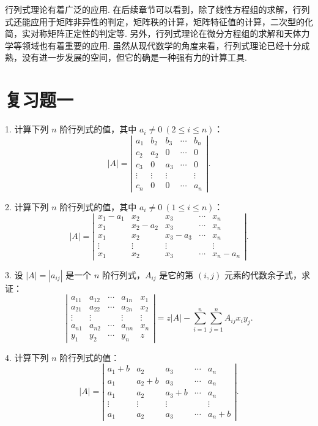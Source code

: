 \documentclass[UTF8, 12pt, fontset=fandol, oneside]{ctexart}
\begin{document}
行列式理论有着广泛的应用. 在后续章节可以看到，除了线性方程组的求解，行列式还能应用于矩阵非异性的判定，矩阵秩的计算，矩阵特征值的计算，二次型的化简，实对称矩阵正定性的判定等. 另外，行列式理论在微分方程组的求解和天体力学等领域也有着重要的应用. 虽然从现代数学的角度来看，行列式理论已经十分成熟，没有进一步发展的空间，但它的确是一种强有力的计算工具.

\section*{复习题一}

1. 计算下列 $n$ 阶行列式的值，其中 $a_i\ne0\ (2\le i\le n)$：
\[
|A|=
\left|\begin{array}{ccccc}
a_1&b_2&b_3&\cdots&b_n\\
c_2&a_2&0&\cdots&0\\
c_3&0&a_3&\cdots&0\\
\vdots&\vdots&\vdots&&\vdots\\
c_n&0&0&\cdots&a_n
\end{array}\right|.
\]

2. 计算下列 $n$ 阶行列式的值，其中 $a_i\ne0\ (1\le i\le n)$：
\[
|A|=
\left|\begin{array}{ccccc}
x_1-a_1&x_2&x_3&\cdots&x_n\\
x_1&x_2-a_2&x_3&\cdots&x_n\\
x_1&x_2&x_3-a_3&\cdots&x_n\\
\vdots&\vdots&\vdots&&\vdots\\
x_1&x_2&x_3&\cdots&x_n-a_n
\end{array}\right|.
\]

3. 设 $|A|=|a_{ij}|$ 是一个 $n$ 阶行列式，$A_{ij}$ 是它的第 $(i,j)$ 元素的代数余子式，求证：
\[
\left|\begin{array}{ccccc}
a_{11}&a_{12}&\cdots&a_{1n}&x_1\\
a_{21}&a_{22}&\cdots&a_{2n}&x_2\\
\vdots&\vdots&&\vdots&\vdots\\
a_{n1}&a_{n2}&\cdots&a_{nn}&x_n\\
y_1&y_2&\cdots&y_n&z
\end{array}\right|
=z|A|-\sum_{i=1}^n\sum_{j=1}^n A_{ij}x_iy_j.
\]

4. 计算下列 $n$ 阶行列式的值：
\[
|A|=
\left|\begin{array}{ccccc}
a_1+b&a_2&a_3&\cdots&a_n\\
a_1&a_2+b&a_3&\cdots&a_n\\
a_1&a_2&a_3+b&\cdots&a_n\\
\vdots&\vdots&\vdots&&\vdots\\
a_1&a_2&a_3&\cdots&a_n+b
\end{array}\right|.
\]
\end{document}
